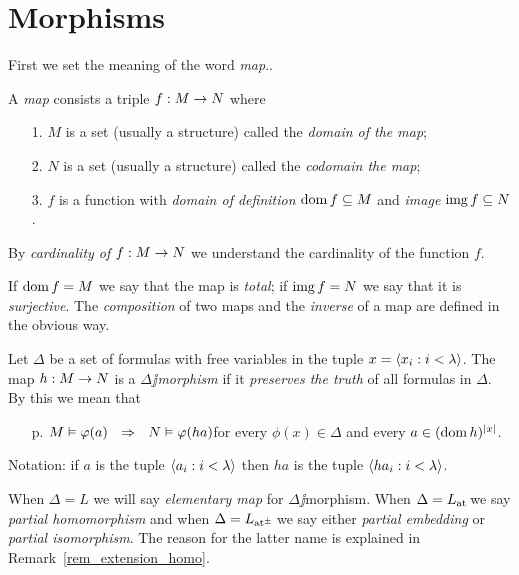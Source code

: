 \documentclass[creche.tex]{subfiles}
\begin{document}
\section{Morphisms}
\label{morphisms}

\def\ceq#1#2#3{\parbox[b]{15ex}{$\displaystyle #1$}\parbox[b]{6ex}{\hfil$#2$}$\displaystyle #3$}

First we set the meaning of the word \emph{map}..

\begin{definition}\label{defmappa}
A \emph{map\/} consists a triple $f:M\rightarrow N$ where
\begin{itemize}
\item[1.] $M$ is a set (usually a structure) called the \emph{domain of the map};
\item[2.] $N$ is a set (usually a structure) called the \emph{codomain the map};
\item[3.] $f$ is a function with \emph{domain of definition\/} $\mathop{\rm dom} f\subseteq M$ and \emph{image} $\mathop{\rm img} f\subseteq N$.
\end{itemize}
By \emph{cardinality of $f:M\rightarrow N$\/} we understand the cardinality of the function $f$.\QED
\end{definition}

If $\mathop{\rm dom} f = M$ we say that the map is \emph{total}; if $\mathop{\rm img} f=N$ we say that it is \emph{surjective\/}.
The \emph{composition\/} of two maps and the \emph{inverse\/} of a map are defined in the obvious way.

\begin{definition}\label{defpreservaveritas}
Let $\Delta$ be a set of formulas with free variables in the tuple $x=\langle x_i: i<\lambda\rangle$.
The map $h:M\rightarrow N$ is a \emph{$\Delta\jj$morphism\/} if it  \emph{preserves the truth\/} of all formulas in $\Delta$.
By this we mean that
\begin{itemize}
\item[p.] $M\models\phi(a)\ \ \IMP\ \ N\models\phi(ha)$\hfill for every $\phi(x)\in\Delta$ and every $a\in(\mathop{\rm dom} h)^{|x|}$.
\end{itemize}
Notation: if $a$ is the tuple $\langle a_i: i<\lambda\rangle$ then $ha$ is the tuple $\langle ha_i: i<\lambda\rangle$.\QED
\end{definition}

When $\Delta=L$ we will say \emph{elementary map\/} for $\Delta\jj$morphism.
When  $\Delta=L_{\tiny\rm at}\hskip-.3ex$ we say  \emph{partial homomorphism\/} and when $\Delta=L_{{\tiny\rm at^\pm}}\hskip-.3ex$ we say either \emph{partial embedding\/} or \emph{partial isomorphism}.
The reason for the latter name is explained in Remark~\ref{rem_extension_homo}.
\end{document}
